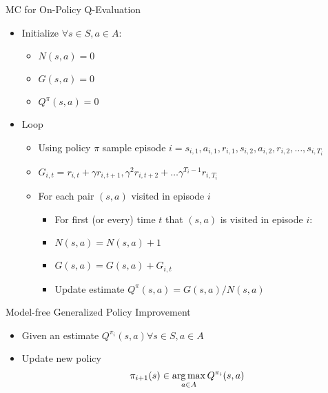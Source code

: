\begin{frame}[c]{MC for On-Policy Q-Evaluation}
	
	\begin{itemize}
		\item Initialize $\forall s\in S, a\in A$:
		\begin{itemize}
			\item $N(s,a) = 0$
			\item $G(s,a) = 0$
			\item $Q^\pi(s,a) =0$
		\end{itemize}
		\item Loop
		\begin{itemize}
			\item Using policy $\pi$ sample episode $i = s_{i,1}, a_{i,1}, r_{i,1}, s_{i,2}, a_{i,2}, r_{i,2}, \ldots, s_{i, T_i}$
			\item $G_{i,t} = r_{i,t} + \gamma r_{i,t+1}, \gamma^2 r_{i,t+2} + \ldots \gamma^{T_i -1} r_{i,T_i}$
			\item For each pair $(s,a)$ visited in episode $i$
			\begin{itemize}
				\item For first (or every) time $t$ that $(s,a)$ is visited in episode $i$:
				\item $N(s,a) = N(s,a) + 1$
				\item $G(s,a) = G(s,a) + G_{i,t}$
				\item Update estimate $Q^\pi(s,a) = G(s,a) /N(s,a)$
			\end{itemize}
		\end{itemize}
	\end{itemize}
	
\end{frame}
\begin{frame}[c]{Model-free Generalized Policy Improvement}
	
	\begin{itemize}
		\item Given an estimate $Q^{\pi_i}(s,a) \forall s\in S, a \in A$
		\item Update new policy
		$$\pi_{i+1}(s) \in \operatorname*{arg\,max}_{a \in A} Q^{\pi_i} (s,a) $$
	\end{itemize}
	
\end{frame}

